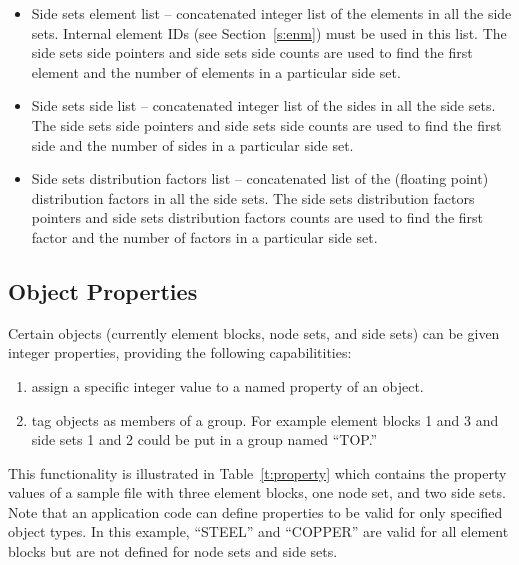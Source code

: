 \begin{itemize}
 \item {Side sets element list -- concatenated integer list of the
 elements in all the side sets.} {Internal element IDs (see
 Section~\ref{s:enm}) must be used in this list.} {The side sets side
 pointers and side sets side counts are used to find the first element
 and the number of elements in a particular side set.}

 \item {Side sets side list -- concatenated integer list of the sides
 in all the side sets. The side sets side pointers and side sets side
 counts are used to find the first side and the number of sides in a
 particular side set.}

 \item {Side sets distribution factors list -- concatenated list of
 the (floating point) distribution factors in all the side sets. The
 side sets distribution factors pointers and side sets distribution
 factors counts are used to find the first factor and the number of
 factors in a particular side set.}
\end{itemize}



\subsection{Object Properties}

Certain \exo{} objects (currently element blocks, node
sets, and side sets) can be given integer properties, providing
the following capabilitities:
\begin{enumerate}
\item assign a specific integer value to a named property of
an object.

\item tag objects as members of a group. For example element
blocks 1 and 3 and side sets 1 and 2 could be put in a group
named ``TOP.''
\end{enumerate}

This functionality is illustrated in Table~\ref{t:property} which
contains the property values of a sample
\exo{} file with three element blocks, one node set, and two
side sets. Note that an application code can define properties
to be valid for only specified object types. In this example,
``STEEL'' and ``COPPER'' are valid for all element blocks but are
not defined for node sets and side sets.

